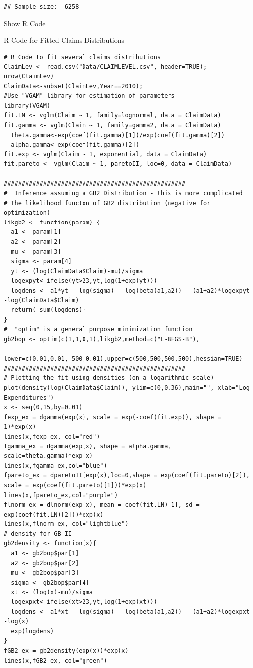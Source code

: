 \documentclass[]{book}
\theoremstyle{definition}
\theoremstyle{definition}
\theoremstyle{definition}
\theoremstyle{remark}
\begin{document}
\begin{verbatim}
## Sample size:  6258
\end{verbatim}

Show R Code

\hypertarget{CODE:S1:FIT}{}
R Code for Fitted Claims Distributions

\begin{verbatim}
# R Code to fit several claims distributions
ClaimLev <- read.csv("Data/CLAIMLEVEL.csv", header=TRUE); nrow(ClaimLev)
ClaimData<-subset(ClaimLev,Year==2010); 
#Use "VGAM" library for estimation of parameters 
library(VGAM)
fit.LN <- vglm(Claim ~ 1, family=lognormal, data = ClaimData)
fit.gamma <- vglm(Claim ~ 1, family=gamma2, data = ClaimData)
  theta.gamma<-exp(coef(fit.gamma)[1])/exp(coef(fit.gamma)[2]) 
  alpha.gamma<-exp(coef(fit.gamma)[2])
fit.exp <- vglm(Claim ~ 1, exponential, data = ClaimData)
fit.pareto <- vglm(Claim ~ 1, paretoII, loc=0, data = ClaimData)

###################################################
#  Inference assuming a GB2 Distribution - this is more complicated
# The likelihood functon of GB2 distribution (negative for optimization)
likgb2 <- function(param) {
  a1 <- param[1]
  a2 <- param[2]
  mu <- param[3]
  sigma <- param[4]
  yt <- (log(ClaimData$Claim)-mu)/sigma
  logexpyt<-ifelse(yt>23,yt,log(1+exp(yt)))
  logdens <- a1*yt - log(sigma) - log(beta(a1,a2)) - (a1+a2)*logexpyt -log(ClaimData$Claim) 
  return(-sum(logdens))
}
#  "optim" is a general purpose minimization function
gb2bop <- optim(c(1,1,0,1),likgb2,method=c("L-BFGS-B"),
                lower=c(0.01,0.01,-500,0.01),upper=c(500,500,500,500),hessian=TRUE)
###################################################
# Plotting the fit using densities (on a logarithmic scale)
plot(density(log(ClaimData$Claim)), ylim=c(0,0.36),main="", xlab="Log Expenditures")
x <- seq(0,15,by=0.01)
fexp_ex = dgamma(exp(x), scale = exp(-coef(fit.exp)), shape = 1)*exp(x)
lines(x,fexp_ex, col="red")
fgamma_ex = dgamma(exp(x), shape = alpha.gamma, scale=theta.gamma)*exp(x)
lines(x,fgamma_ex,col="blue")
fpareto_ex = dparetoII(exp(x),loc=0,shape = exp(coef(fit.pareto)[2]), scale = exp(coef(fit.pareto)[1]))*exp(x)
lines(x,fpareto_ex,col="purple")
flnorm_ex = dlnorm(exp(x), mean = coef(fit.LN)[1], sd = exp(coef(fit.LN)[2]))*exp(x)
lines(x,flnorm_ex, col="lightblue")
# density for GB II
gb2density <- function(x){
  a1 <- gb2bop$par[1]
  a2 <- gb2bop$par[2]
  mu <- gb2bop$par[3]
  sigma <- gb2bop$par[4]
  xt <- (log(x)-mu)/sigma
  logexpxt<-ifelse(xt>23,yt,log(1+exp(xt)))
  logdens <- a1*xt - log(sigma) - log(beta(a1,a2)) - (a1+a2)*logexpxt -log(x) 
  exp(logdens)
}
fGB2_ex = gb2density(exp(x))*exp(x)
lines(x,fGB2_ex, col="green")
\end{verbatim}
\end{document}
